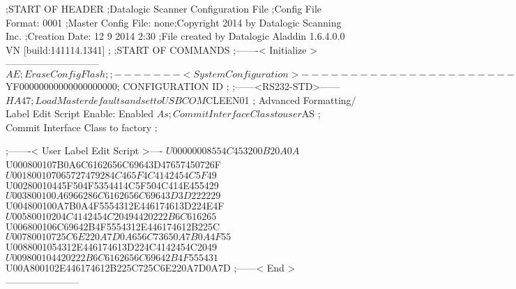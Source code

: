 ;START OF HEADER
;Datalogic Scanner Configuration File
;Config File Format: 0001
;Master Config File: none;Copyright 2014 by Datalogic Scanning Inc.
;Creation Date: 12 9 2014 2:30
;File created by Datalogic Aladdin 1.6.4.0.0 VN [build:141114.1341]
;
;START OF COMMANDS
;-------< Initialize >-----------------------------
$AE                 ; Erase Config Flash
;
;-------< System Configuration >-------------------------------
$YF00000000000000000000; CONFIGURATION ID
;
;------<RS232-STD>------
$HA47              ; Load Master defaults and set to USBCOM
$CLEEN01            ; Advanced Formatting/ Label Edit Script Enable: Enabled
$As                 ; Commit Interface Class to user
$AS                 ; Commit Interface Class to factory
;

;-------< User Label Edit Script >----
$U00000008554C453200B20A0A
$U000800107B0A6C6162656C69643D47657450726F
$U001800107065727479284C465F4C4142454C5F49
$U00280010445F504F5354414C5F504C414E455429
$U003800100A6966286C6162656C69643D3D222229
$U004800100A7B0A4F5554312E446174613D224E4F
$U00580010204C4142454C20494420222B6C616265
$U006800106C69642B4F5554312E446174612B225C
$U00780010725C6E220A7D0A656C73650A7B0A4F55
$U0088001054312E446174613D224C4142454C2049
$U009800104420222B6C6162656C69642B4F555431
$U00A800102E446174612B225C725C6E220A7D0A7D
;------< End >-----------------------
